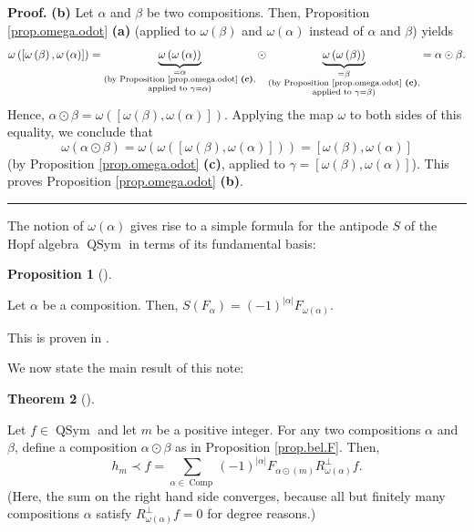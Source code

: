 \documentclass
[numbers=enddot,12pt,final,onecolumn,notitlepage,abstracton]{scrartcl}%
\theoremstyle{definition}
\newtheorem{theo}{Theorem}[section]
\newenvironment{theorem}[1][]
{\begin{theo}[#1]\begin{leftbar}}
{\end{leftbar}\end{theo}}
\newtheorem{prop}[theo]{Proposition}
\newenvironment{proposition}[1][]
{\begin{prop}[#1]\begin{leftbar}}
{\end{leftbar}\end{prop}}
\newenvironment{proof}[1][Proof]{\noindent\textbf{#1.} }{\ \rule{0.5em}{0.5em}}
\newenvironment{verlong}{}{}
\let\sumnonlimits\sum
\renewcommand{\sum}{\sumnonlimits\limits}
\begin{document}
\begin{verlong}
\begin{proof}
\textbf{(b)} Let $\alpha$ and $\beta$ be two compositions. Then, Proposition
\ref{prop.omega.odot} \textbf{(a)} (applied to $\omega\left(  \beta\right)  $
and $\omega\left(  \alpha\right)  $ instead of $\alpha$ and $\beta$) yields%
\[
\omega\left(  \left[  \omega\left(  \beta\right)  ,\omega\left(
\alpha\right)  \right]  \right)  =\underbrace{\omega\left(  \omega\left(
\alpha\right)  \right)  }_{\substack{=\alpha\\\text{(by Proposition
\ref{prop.omega.odot} \textbf{(c)},}\\\text{applied to }\gamma=\alpha\text{)}%
}}\odot\underbrace{\omega\left(  \omega\left(  \beta\right)  \right)
}_{\substack{=\beta\\\text{(by Proposition \ref{prop.omega.odot}
\textbf{(c)},}\\\text{applied to }\gamma=\beta\text{)}}}=\alpha\odot\beta.
\]
Hence, $\alpha\odot\beta=\omega\left(  \left[  \omega\left(  \beta\right)
,\omega\left(  \alpha\right)  \right]  \right)  $. Applying the map $\omega$
to both sides of this equality, we conclude that%
\[
\omega\left(  \alpha\odot\beta\right)  =\omega\left(  \omega\left(  \left[
\omega\left(  \beta\right)  ,\omega\left(  \alpha\right)  \right]  \right)
\right)  =\left[  \omega\left(  \beta\right)  ,\omega\left(  \alpha\right)
\right]
\]
(by Proposition \ref{prop.omega.odot} \textbf{(c)}, applied to $\gamma=\left[
\omega\left(  \beta\right)  ,\omega\left(  \alpha\right)  \right]  $). This
proves Proposition \ref{prop.omega.odot} \textbf{(b)}.
\end{proof}
\end{verlong}

The notion of $\omega\left(  \alpha\right)  $ gives rise to a simple formula
for the antipode $S$ of the Hopf algebra $\operatorname*{QSym}$ in terms of
its fundamental basis:

\begin{proposition}
\label{prop.S.F}Let $\alpha$ be a composition. Then, $S\left(  F_{\alpha
}\right)  =\left(  -1\right)  ^{\left\vert \alpha\right\vert }F_{\omega\left(
\alpha\right)  }$.
\end{proposition}

This is proven in \cite[Proposition 5.2.15]{Reiner}.

We now state the main result of this note:

\begin{theorem}
\label{thm.hmDless}Let $f\in\operatorname*{QSym}$ and let $m$ be a positive
integer. For any two compositions $\alpha$ and $\beta$, define a composition
$\alpha\odot\beta$ as in Proposition \ref{prop.bel.F}. Then,%
\[
h_{m}\left.  \prec\right.  f=\sum_{\alpha\in\operatorname*{Comp}}\left(
-1\right)  ^{\left\vert \alpha\right\vert }F_{\alpha\odot\left(  m\right)
}R_{\omega\left(  \alpha\right)  }^{\perp}f.
\]
(Here, the sum on the right hand side converges, because all but finitely many
compositions $\alpha$ satisfy $R_{\omega\left(  \alpha\right)  }^{\perp}f=0$
for degree reasons.)
\end{theorem}
\end{document}
